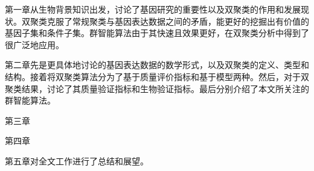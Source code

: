     第一章从生物背景知识出发，讨论了基因研究的重要性以及双聚类的作用和发展现状。双聚类克服了常规聚类与基因表达数据之间的矛盾，能更好的挖掘出有价值的基因子集和条件子集。群智能算法由于其快速且效果更好，在双聚类分析中得到了很广泛地应用。

    第二章先是更具体地讨论的基因表达数据的数学形式，以及双聚类的定义、类型和结构。接着将双聚类算法分为了基于质量评价指标和基于模型两种。然后，对于双聚类结果，讨论了其质量验证指标和生物验证指标。最后分别介绍了本文所关注的群智能算法。

    第三章

    第四章
    
    第五章对全文工作进行了总结和展望。
